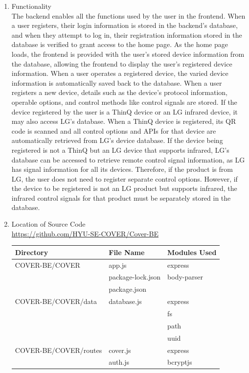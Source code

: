 \documentclass[conference]{IEEEtran}
\begin{document}
\begin{enumerate}[label=\arabic*.]
\item Functionality\\
The backend enables all the functions used by the user in the frontend. When a user registers, their login information is stored in the backend's database, and when they attempt to log in, their registration information stored in the database is verified to grant access to the home page. As the home page loads, the frontend is provided with the user's stored device information from the database, allowing the frontend to display the user's registered device information. When a user operates a registered device, the varied device information is automatically saved back to the database. When a user registers a new device, details such as the device's protocol information, operable options, and control methods like control signals are stored. If the device registered by the user is a ThinQ device or an LG infrared device, it may also access LG's database. When a ThinQ device is registered, its QR code is scanned and all control options and APIs for that device are automatically retrieved from LG's device database. If the device being registered is not a ThinQ but an LG device that supports infrared, LG's database can be accessed to retrieve remote control signal information, as LG has signal information for all its devices. Therefore, if the product is from LG, the user does not need to register separate control options. However, if the device to be registered is not an LG product but supports infrared, the infrared control signals for that product must be separately stored in the database.\\

\item Location of Source Code\\
\url{https://github.com/HYU-SE-COVER/Cover-BE}
\begin{table}[h!]
\setlength{\extrarowheight}{2.5pt}
\centering
\begin{tabular}{|l|l|l|}
\hline
\textbf{Directory} & \textbf{File Name} & \textbf{Modules Used} \\
\hline
COVER-BE/COVER & app.js & express \\
 & package-lock.json & body-parser \\
 & package.json & \\
\hline
COVER-BE/COVER/data & database.js & express \\
 & & fs \\
 & & path \\
 & & uuid \\
\hline
COVER-BE/COVER/routes & cover.js & express \\
 & auth.js & bcryptjs \\
\hline
\end{tabular}
\end{table}


\end{enumerate}
\end{document}
